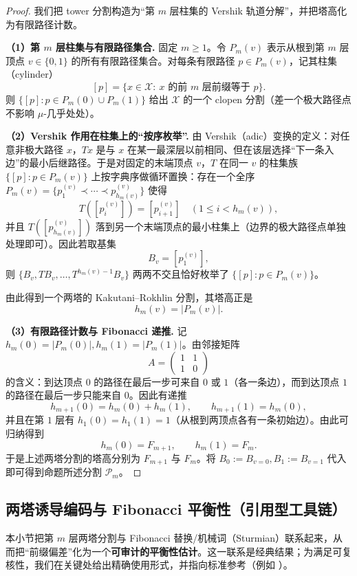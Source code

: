 \begin{proof}
我们把 tower 分割构造为“第 $m$ 层柱集的 Vershik 轨道分解”，并把塔高化为有限路径计数。

\textbf{（1）第 $m$ 层柱集与有限路径集合.}
固定 $m\ge 1$。令 $P_m(v)$ 表示从根到第 $m$ 层顶点 $v\in\{0,1\}$ 的所有有限路径集合。对每条有限路径 $p\in P_m(v)$，记其柱集（cylinder）
$$
[p]=\{x\in\mathcal{X}:\ x\text{ 的前 }m\text{ 层前缀等于 }p\}.
$$
则 $\{[p]:p\in P_m(0)\cup P_m(1)\}$ 给出 $\mathcal{X}$ 的一个 clopen 分割（差一个极大路径点不影响 $\mu$-几乎处处）。

\textbf{（2）Vershik 作用在柱集上的“按序枚举”.}
由 Vershik（adic）变换的定义：对任意非极大路径 $x$，$Tx$ 是与 $x$ 在某一最深层以前相同、但在该层选择“下一条入边”的最小后继路径。于是对固定的末端顶点 $v$，$T$ 在同一 $v$ 的柱集族 $\{[p]:p\in P_m(v)\}$ 上按字典序做循环置换：存在一个全序 $P_m(v)=\{p^{(v)}_1\prec\cdots\prec p^{(v)}_{h_m(v)}\}$ 使得
$$
T([p^{(v)}_i])=[p^{(v)}_{i+1}]\quad(1\le i<h_m(v)),
$$
并且 $T([p^{(v)}_{h_m(v)}])$ 落到另一个末端顶点的最小柱集上（边界的极大路径点单独处理即可）。因此若取基集
$$
B_v=[p^{(v)}_1],
$$
则 $\{B_v,TB_v,\dots,T^{h_m(v)-1}B_v\}$ 两两不交且恰好枚举了 $\{[p]:p\in P_m(v)\}$。

由此得到一个两塔的 Kakutani--Rokhlin 分割，其塔高正是
$$
h_m(v)=|P_m(v)|.
$$

\textbf{（3）有限路径计数与 Fibonacci 递推.}
记 $h_m(0)=|P_m(0)|,h_m(1)=|P_m(1)|$。由邻接矩阵
$$
A=\begin{pmatrix}1&1\\1&0\end{pmatrix}
$$
的含义：到达顶点 $0$ 的路径在最后一步可来自 $0$ 或 $1$（各一条边），而到达顶点 $1$ 的路径在最后一步只能来自 $0$。因此有递推
$$
h_{m+1}(0)=h_m(0)+h_m(1),\qquad h_{m+1}(1)=h_m(0),
$$
并且在第 $1$ 层有 $h_1(0)=h_1(1)=1$（从根到两顶点各有一条初始边）。由此可归纳得到
$$
h_m(0)=F_{m+1},\qquad h_m(1)=F_m.
$$
于是上述两塔分割的塔高分别为 $F_{m+1}$ 与 $F_m$。将 $B_0:=B_{v=0},B_1:=B_{v=1}$ 代入即可得到命题所述分割 $\mathcal{P}_m$。
\end{proof}

\subsection{两塔诱导编码与 Fibonacci 平衡性（引用型工具链）}

本小节把第 $m$ 层两塔分割与 Fibonacci 替换/机械词（Sturmian）联系起来，从而把“前缀偏差”化为一个\textbf{可审计的平衡性估计}。这一联系是经典结果；为满足可复核性，我们在关键处给出精确使用形式，并指向标准参考（例如 \cite{durand1999substitutional,queffelec2010substitution,lothaire2002acow}）。

